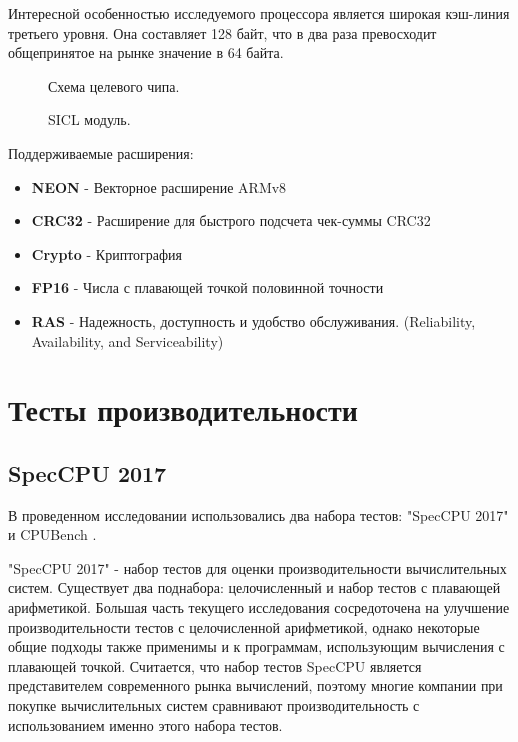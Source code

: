 Интересной особенностью исследуемого процессора является широкая кэш-линия третьего уровня. Она составляет 128 байт, что в два раза превосходит общепринятое на рынке значение в 64 байта. 

\begin{figure}[htbp]
	\centering
	
	\caption{Схема целевого чипа.}
	\label{chip1}
\end{figure}
\begin{figure}[htbp]
	\centering
	
	\caption{SICL модуль.}
	\label{chip2}
\end{figure}

Поддерживаемые расширения:
\begin{itemize}
	\item  \textbf{NEON} - Векторное расширение ARMv8
	\item  \textbf{CRC32} - Расширение для быстрого подсчета чек-суммы CRC32
	\item  \textbf{Crypto} - Криптография
	\item  \textbf{FP16} - Числа с плавающей точкой половинной точности
	\item  \textbf{RAS} -  Надежность, доступность и удобство обслуживания. (Reliability, Availability, and Serviceability)
\end{itemize}

\section{Тесты производительности}\label{p1:tests}
\subsection{SpecCPU 2017}\label{p1:tests:spec}
В проведенном исследовании использовались два набора тестов: "SpecCPU 2017"\phantom{ } \cite{bucek2018spec} и CPUBench \cite{lu2023cpubench}. 

"SpecCPU 2017"\phantom{} - набор тестов для оценки производительности вычислительных систем. Существует два поднабора: целочисленный и набор тестов с плавающей арифметикой. Большая часть текущего исследования сосредоточена на улучшение производительности тестов с целочисленной арифметикой, однако некоторые общие подходы также применимы и к программам, использующим вычисления с плавающей точкой. Считается, что набор тестов SpecCPU является представителем современного рынка вычислений, поэтому многие компании при покупке вычислительных систем сравнивают производительность с использованием именно этого набора тестов. \cite{bucek2018spec}

